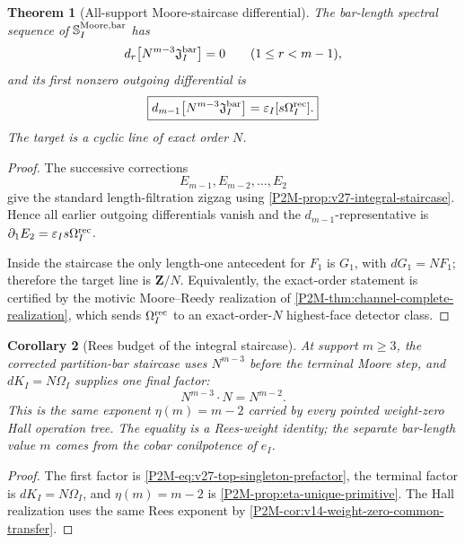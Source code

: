 \documentclass[11pt]{article}
\newtheorem{theorem}{Theorem}[section]
\newtheorem{corollary}[theorem]{Corollary}
\theoremstyle{remark}
\newcommand{\Z}{\mathbf Z}
\begin{document}
\begin{theorem}[All-support Moore-staircase differential]
\label{P2M-thm:v27-all-support-moore-staircase}
The bar-length spectral sequence of
\(\mathbb S_I^{\rm Moore,bar}\) has
\[
 d_r\bigl[N^{m-3}\mathfrak J_I^{\rm bar}\bigr]=0
 \qquad(1\le r<m-1),
\]
and its first nonzero outgoing differential is
\begin{equation}
 \boxed{
 d_{m-1}
 \bigl[
   N^{m-3}\mathfrak J_I^{\rm bar}
 \bigr]
 =
 \varepsilon_I
 [s\Omega_I^{\rm rec}].}
\end{equation}
The target is a cyclic line of exact order \(N\).
\end{theorem}

\begin{proof}
The successive corrections
\[
 E_{m-1},E_{m-2},\ldots,E_2
\]
give the standard length-filtration zigzag using
\cref{P2M-prop:v27-integral-staircase}.  Hence all earlier outgoing
differentials vanish and the \(d_{m-1}\)-representative is
\(\partial_1E_2=\varepsilon_Is\Omega_I^{\rm rec}\).

Inside the staircase the only length-one antecedent for \(F_1\) is \(G_1\),
with \(dG_1=NF_1\); therefore the target line is \(\Z/N\).  Equivalently,
the exact-order statement is certified by the motivic Moore--Reedy
realization of \cref{P2M-thm:channel-complete-realization}, which sends
\(\Omega_I^{\rm rec}\) to an exact-order-\(N\) highest-face detector class.
\end{proof}

\begin{corollary}[Rees budget of the integral staircase]
\label{P2M-cor:v27-bar-transfer-exponent}
At support \(m\ge3\), the corrected partition-bar staircase uses
\(N^{m-3}\) before the terminal Moore step, and
\(dK_I=N\Omega_I\) supplies one final factor:
\begin{equation}
 \boxed{N^{m-3}\cdot N=N^{m-2}.}
\end{equation}
This is the same exponent
\(\eta(m)=m-2\) carried by every pointed weight-zero Hall operation tree.
The equality is a Rees-weight identity; the separate bar-length value \(m\)
comes from the cobar conilpotence of \(e_I\).
\end{corollary}

\begin{proof}
The first factor is
\eqref{P2M-eq:v27-top-singleton-prefactor}, the terminal factor is
\(dK_I=N\Omega_I\), and
\(\eta(m)=m-2\) is \cref{P2M-prop:eta-unique-primitive}.  The Hall realization
uses the same Rees exponent by
\cref{P2M-cor:v14-weight-zero-common-transfer}.
\end{proof}
\end{document}

